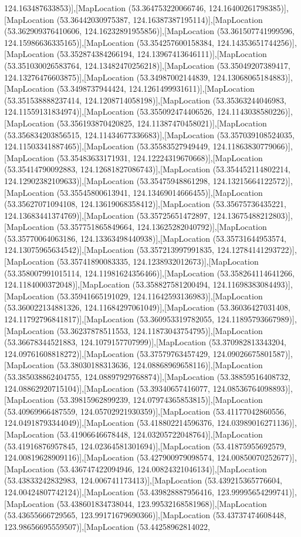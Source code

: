 124.163487633853)],[MapLocation (53.364753220066746, 124.16400261798385)],[MapLocation (53.36442030975387, 124.16387387195114)],[MapLocation (53.362909376410606, 124.16232891955856)],[MapLocation (53.361507741999596, 124.15986636335165)],[MapLocation (53.354257600158384, 124.14353651744256)],[MapLocation (53.352874384266194, 124.13967413646111)],[MapLocation (53.351030026583764, 124.13482470256218)],[MapLocation (53.35049207389417, 124.13276476603875)],[MapLocation (53.34987002144839, 124.13068065184883)],[MapLocation (53.3498737944424, 124.1261499931611)],[MapLocation (53.351538888237414, 124.1208714058198)],[MapLocation (53.35363244046983, 124.11559131834974)],[MapLocation (53.355092474406526, 124.1143038580226)],[MapLocation (53.356193870420825, 124.11387470458021)],[MapLocation (53.356834203856515, 124.11434677336683)],[MapLocation (53.357039108524035, 124.11503341887465)],[MapLocation (53.35583527949449, 124.11863830779066)],[MapLocation (53.35483633171931, 124.12224319670668)],[MapLocation (53.35414790092883, 124.12681827086743)],[MapLocation (53.354452114802214, 124.12902382109633)],[MapLocation (53.35475948861298, 124.13215664122572)],[MapLocation (53.35545800613941, 124.13469014666455)],[MapLocation (53.35627071094108, 124.13619068358412)],[MapLocation (53.35675736435221, 124.13683441374769)],[MapLocation (53.35725651472897, 124.13675488212803)],[MapLocation (53.357751865849664, 124.13625282040792)],[MapLocation (53.35770064063186, 124.13363498440938)],[MapLocation (53.35731644953574, 124.13075965634542)],[MapLocation (53.357213997991835, 124.12784141293722)],[MapLocation (53.35741890083335, 124.1238932012673)],[MapLocation (53.358007991015114, 124.11981624356466)],[MapLocation (53.358264114641266, 124.1184000372048)],[MapLocation (53.358827581200494, 124.11698383084493)],[MapLocation (53.35941665191029, 124.11642593136983)],[MapLocation (53.360022134881326, 124.11684297061049)],[MapLocation (53.36036427031408, 124.11792796841817)],[MapLocation (53.360953319782055, 124.11895793667989)],[MapLocation (53.36237878511553, 124.11873043754795)],[MapLocation (53.36678344521883, 124.1079157707999)],[MapLocation (53.370982813343204, 124.09761608818272)],[MapLocation (53.37579763457429, 124.09026675801587)],[MapLocation (53.38030188313636, 124.08868969658116)],[MapLocation (53.385038862404755, 124.08897929768874)],[MapLocation (53.38859516408732, 124.08862920715104)],[MapLocation (53.39340657416077, 124.08536764098893)],[MapLocation (53.39815962899239, 124.07974365853815)],[MapLocation (53.40969966487559, 124.05702921930359)],[MapLocation (53.41177042860556, 124.04918793344049)],[MapLocation (53.418802214596376, 124.03989016271136)],[MapLocation (53.41906646678448, 124.03205722048764)],[MapLocation (53.41916876957845, 124.02364581301694)],[MapLocation (53.41875955692579, 124.00819628909116)],[MapLocation (53.427900979098574, 124.00850070252677)],[MapLocation (53.436747422094946, 124.00824321046134)],[MapLocation (53.43833242832983, 124.006741173413)],[MapLocation (53.439215365776604, 124.00424807742124)],[MapLocation (53.439828887956416, 123.99995654299741)],[MapLocation (53.438601834738044, 123.99532168581968)],[MapLocation (53.43655666729565, 123.99171679690366)],[MapLocation (53.43737474608448, 123.98656695559507)],[MapLocation (53.44258962814022, 